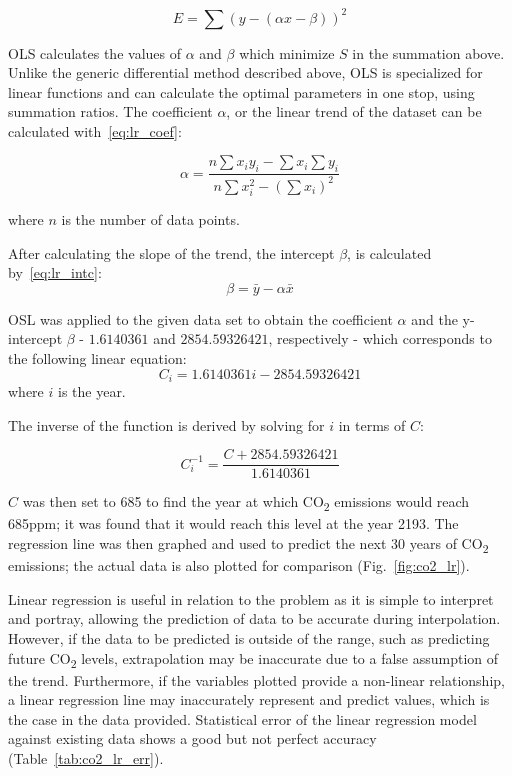 \documentclass{mcmthesis}
\begin{document}
    \begin{equation}
        E = \sum{(y - (\alpha x - \beta))^2}
        \label{eq:ls_lr}
    \end{equation}

    OLS calculates the values of $\alpha$ and $\beta$ which minimize $S$ in the summation above.
    Unlike the generic differential method described above, OLS is specialized for linear functions and can calculate the optimal parameters in one stop, using summation ratios.
    The coefficient $\alpha$, or the linear trend of the dataset can be calculated with~\eqref{eq:lr_coef}:

    \begin{equation}
        \alpha = \frac{n \sum x_i y_i - \sum x_i \sum y_i }{n \sum x^2_i - (\sum x_i)^2}
        \label{eq:lr_coef}
    \end{equation}

    \noindent where $n$ is the number of data points.

    After calculating the slope of the trend, the intercept $\beta$, is calculated by~\eqref{eq:lr_intc}:
%
    \begin{equation}
        \beta = \bar y - \alpha \bar x
        \label{eq:lr_intc}
    \end{equation}

    OSL was applied to the given data set to obtain the coefficient $\alpha$ and the y-intercept $\beta$ - $1.6140361$ and $2854.59326421$, respectively - which corresponds to the following linear equation:
%
    \begin{equation}
        C_i = 1.6140361 i - 2854.59326421
        \label{eq:co2_lr}
    \end{equation}
%
    \noindent where $i$ is the year.

    The inverse of the function is derived by solving for $i$ in terms of $C$:

    \begin{equation}
        C^{-1}_i = \frac{C + 2854.59326421}{1.6140361}
        \label{eq:co2_lr_inv}
    \end{equation}

    $C$ was then set to 685 to find the year at which CO\textsubscript{2} emissions would reach 685ppm; it was found that it would reach this level at the year 2193.
    The regression line was then graphed and used to predict the next 30 years of CO\textsubscript{2} emissions; the actual data is also plotted for comparison (Fig.~\ref{fig:co2_lr}).


    Linear regression is useful in relation to the problem as it is simple to interpret and portray, allowing the prediction of data to be accurate during interpolation.
    However, if the data to be predicted is outside of the range, such as predicting future CO\textsubscript{2} levels, extrapolation may be inaccurate due to a false assumption of the trend.
    Furthermore, if the variables plotted provide a non-linear relationship, a linear regression line may inaccurately represent and predict values, which is the case in the data provided.
    Statistical error of the linear regression model against existing data shows a good but not perfect accuracy (Table~\ref{tab:co2_lr_err}).
\end{document}
